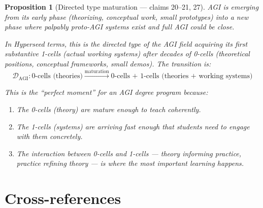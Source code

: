 \documentclass[11pt,a4paper]{article}
\newtheorem{proposition}[definition]{Proposition}
\begin{document}
\begin{proposition}[Directed type maturation --- claims 20--21, 27]
\label{prop:maturation}
AGI is emerging from its early phase (theorizing, conceptual work,
small prototypes) into a new phase where palpably proto-AGI systems
exist and full AGI could be close.

In Hyperseed terms, this is the directed type of the AGI field acquiring
its first substantive 1-cells (actual working systems) after decades of
0-cells (theoretical positions, conceptual frameworks, small demos).
The transition is:
\[
  \mathcal{D}_{\text{AGI}} : \text{0-cells (theories)} \xrightarrow{\text{maturation}}
  \text{0-cells + 1-cells (theories + working systems)}
\]

This is the ``perfect moment'' for an AGI degree program because:
\begin{enumerate}
\item The 0-cells (theory) are mature enough to teach coherently.
\item The 1-cells (systems) are arriving fast enough that students need
  to engage with them concretely.
\item The interaction between 0-cells and 1-cells --- theory informing
  practice, practice refining theory --- is where the most important
  learning happens.
\end{enumerate}
\end{proposition}


\section{Cross-references}
\end{document}
